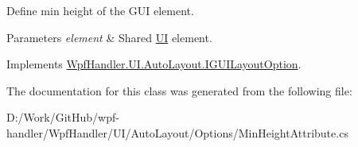 Define min height of the G\+UI element. 


\begin{DoxyParams}{Parameters}
{\em element} & Shared \mbox{\hyperlink{namespace_wpf_handler_1_1_u_i}{UI}} element.\\
\hline
\end{DoxyParams}


Implements \mbox{\hyperlink{interface_wpf_handler_1_1_u_i_1_1_auto_layout_1_1_i_g_u_i_layout_option_ac2d2fa8aeaf753b3248381399f991005}{Wpf\+Handler.\+U\+I.\+Auto\+Layout.\+I\+G\+U\+I\+Layout\+Option}}.



The documentation for this class was generated from the following file\+:\begin{DoxyCompactItemize}
\item 
D\+:/\+Work/\+Git\+Hub/wpf-\/handler/\+Wpf\+Handler/\+U\+I/\+Auto\+Layout/\+Options/Min\+Height\+Attribute.\+cs\end{DoxyCompactItemize}
